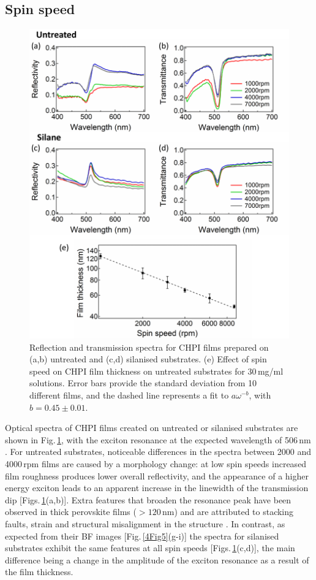 \subsection{Spin speed}
\label{sec:4-5}
\begin{figure}[h!] 
\centering    
\includegraphics[width=\textwidth]{Fig6}
\caption{Reflection and transmission spectra for CHPI films prepared on (a,b) untreated and (c,d) silanised substrates. (e) Effect of spin speed on CHPI film thickness on untreated substrates for 30\,mg/ml solutions. Error bars provide the standard deviation from 10 different films, and the dashed line represents a fit to $a\omega^{-b}$, with $b=0.45\pm0.01$.}
\label{4Fig6}
\end{figure}
Optical spectra of CHPI films created on untreated or silanised substrates are shown in Fig.\,\ref{4Fig6}, with the exciton resonance at the expected wavelength of 506\,nm \cite{Pradeesh2009b}. For untreated substrates, noticeable differences in the spectra between 2000 and 4000\,rpm films are caused by a morphology change: at low spin speeds increased film roughness produces lower overall reflectivity, and the appearance of a higher energy exciton leads to an apparent increase in the linewidth of the transmission dip [Figs.\,\ref{4Fig6}(a,b)]. Extra features that broaden the resonance peak have been observed in thick perovskite films ($>120$\,nm) and are attributed to stacking faults, strain and structural misalignment in the structure \cite{VijayaPrakash2009}. In contrast, as expected from their BF images [Fig.\,\ref{4Fig5}(g-i)] the spectra for silanised substrates exhibit the same features at all spin speeds [Figs.\,\ref{4Fig6}(c,d)], the main difference being a change in the amplitude of the exciton resonance as a result of the film thickness. 


